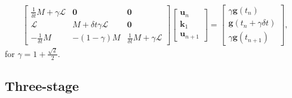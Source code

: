 \documentclass[a4paper,10pt]{article}
\begin{document}
\begin{align*}
\begin{bmatrix} \tfrac{1}{\delta t}M + \gamma\mathcal{L} & \mathbf{0}  & \mathbf{0}  \\
	\mathcal{L} & M + \delta t\gamma\mathcal{L} & \mathbf{0} \\
	-\tfrac{1}{\delta t}M & -(1-\gamma)M & \tfrac{1}{\delta t}M + \gamma\mathcal{L} \end{bmatrix}
	\begin{bmatrix} \mathbf{u}_n \\ \mathbf{k}_1 \\ \mathbf{u}_{n+1} \end{bmatrix} = 
	\begin{bmatrix} \gamma\mathbf{g}(t_{n}) \\ \mathbf{g}(t_{n}+\gamma\delta t) \\ \gamma\mathbf{g}(t_{n+1}) \end{bmatrix},
\end{align*}
%
for $\gamma = 1 + \frac{\sqrt{2}}{2}$.

\subsection{Three-stage}
\end{document}
